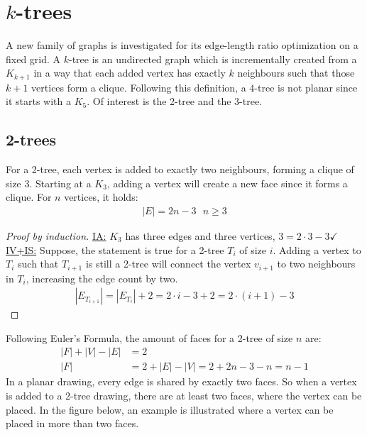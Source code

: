 \section{$k$-trees}
A new family of graphs is investigated for its edge-length ratio optimization on a fixed grid. A $k$-tree is an undirected graph which is incrementally created from a $K_{k+1}$ in a way that each added vertex has exactly $k$ neighbours such that those $k+1$ vertices form a clique. Following this definition, a $4$-tree is not planar since it starts with a $K_5$. Of interest is the 2-tree and the 3-tree. 
\subsection{2-trees}
For a 2-tree, each vertex is added to exactly two neighbours, forming a clique of size 3. Starting at a $K_3$, adding a vertex will create a new face since it forms a clique. For $n$ vertices, it holds: 
\begin{align}
	|E| = 2n-3 ~~~n\geq 3
\end{align}
\begin{proof}[Proof by induction]
	\underline{IA:} $K_3$ has three edges and three vertices, $3 = 2\cdot3-3 \checkmark$\\
	\underline{IV+IS:} Suppose, the statement is true for a 2-tree $T_i$ of size $i$. Adding a vertex to $T_i$ such that $T_{i+1}$ is still a 2-tree will connect the vertex $v_{i+1}$ to two neighbours in $T_i$, increasing the edge count by two.
	\begin{align*}
		|E_{T_{i+1}}| = |E_{T_i}| + 2 = 2\cdot i -3 + 2 = 2\cdot(i+1)-3
	\end{align*}
\end{proof}
Following Euler's Formula, the amount of faces for a 2-tree of size $n$ are:
\begin{align*}
	|F|+|V|-|E| &= 2\\
	|F| &= 2 + |E| - |V| = 2 + 2n-3 - n = n-1
\end{align*}
In a planar drawing, every edge is shared by exactly two faces. So when a vertex is added to a 2-tree drawing, there are at least two faces, where the vertex can be placed. In the figure below, an example is illustrated where a vertex can be placed in more than two faces.

